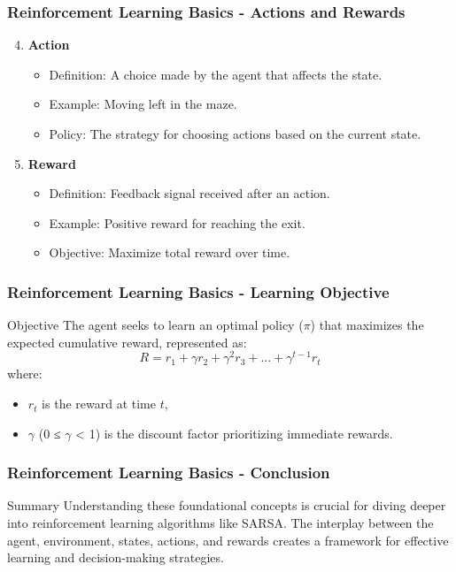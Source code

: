\documentclass{beamer}
\begin{document}
\begin{frame}[fragile]
    \frametitle{Reinforcement Learning Basics - Actions and Rewards}
    \begin{enumerate}
        \setcounter{enumi}{3}
        \item \textbf{Action}
            \begin{itemize}
                \item Definition: A choice made by the agent that affects the state.
                \item Example: Moving left in the maze.
                \item Policy: The strategy for choosing actions based on the current state.
            \end{itemize}
        
        \item \textbf{Reward}
            \begin{itemize}
                \item Definition: Feedback signal received after an action.
                \item Example: Positive reward for reaching the exit.
                \item Objective: Maximize total reward over time.
            \end{itemize}
    \end{enumerate}
\end{frame}

\begin{frame}[fragile]
    \frametitle{Reinforcement Learning Basics - Learning Objective}
    \begin{block}{Objective}
        The agent seeks to learn an optimal policy (\(\pi\)) that maximizes the expected cumulative reward, represented as:
        \begin{equation}
            R = r_1 + \gamma r_2 + \gamma^2 r_3 + ... + \gamma^{t-1} r_t
        \end{equation}
        where:
        \begin{itemize}
            \item \(r_t\) is the reward at time \(t\),
            \item \(\gamma\) (0 ≤ \(\gamma\) < 1) is the discount factor prioritizing immediate rewards.
        \end{itemize}
    \end{block}
\end{frame}

\begin{frame}[fragile]
    \frametitle{Reinforcement Learning Basics - Conclusion}
    \begin{block}{Summary}
        Understanding these foundational concepts is crucial for diving deeper into reinforcement learning algorithms like SARSA. The interplay between the agent, environment, states, actions, and rewards creates a framework for effective learning and decision-making strategies.
    \end{block}
\end{frame}
\end{document}
